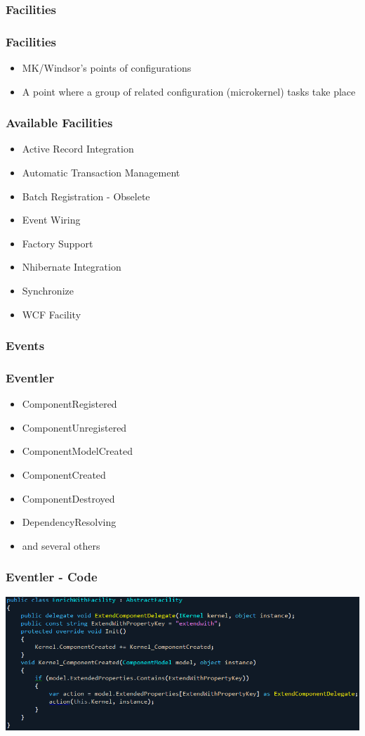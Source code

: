 \documentclass[turkish]{beamer}
\begin{document}
			\subsubsection{Facilities}
				\frame
				{
					\frametitle{Facilities}
					\begin{itemize}
						\item<1-> MK/Windsor's points of configurations
						\item<2-> A point where a group of related configuration (microkernel) tasks take place
					\end{itemize}
			  }
			  \frame
				{
					\frametitle{Available Facilities}
					\begin{itemize}
						\item<1-> Active Record Integration
						\item<2-> Automatic Transaction Management
						\item<3-> Batch Registration - Obselete
						\item<4-> Event Wiring
						\item<5-> Factory Support
						\item<6-> Nhibernate Integration
						\item<7-> Synchronize
						\item<8-> WCF Facility
					\end{itemize}
				}
			\subsubsection{Events}
				\frame
				{
					\frametitle{Eventler}
					\begin{itemize}
						\item<1-> ComponentRegistered
						\item<2-> ComponentUnregistered
						\item<3-> ComponentModelCreated
						\item<4-> ComponentCreated
						\item<5-> ComponentDestroyed
						\item<6-> DependencyResolving
						\item<7-> and several others
  				\end{itemize}
  				
				}
				\frame
				{
					\frametitle{Eventler - Code}
					\begin{center}
						\includegraphics[scale=0.40]{images/enrichwithfacility.png}
  				\end{center}
				}
\end{document}
